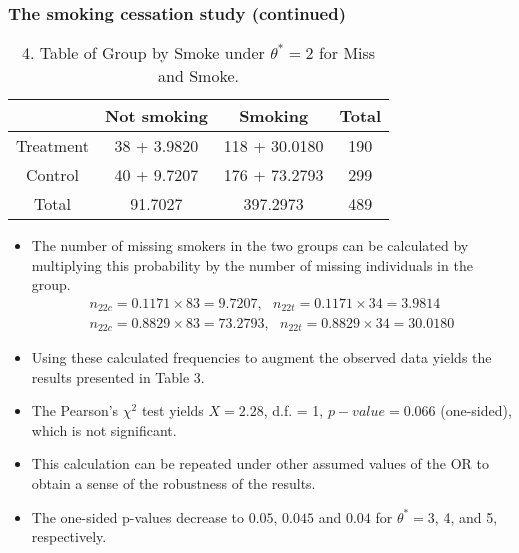 \documentclass{beamer}
\begin{document}
\begin{frame}
\frametitle{The smoking cessation study (continued)}
\begin{table}
\caption{4. Table of Group by Smoke under $\theta^* = 2$ for Miss and Smoke.}\label{tbl3}
\centering
\begin{tabular}{c|cc|c}\hline
 & Not smoking & Smoking & Total \\\hline
Treatment & 38 + {\color{red}3.9820} & 118 + {\color{red}30.0180} & 190 \\
Control & 40 + {\color{red}9.7207} & 176 + {\color{red}73.2793} & 299 \\\hline
Total  & 91.7027 & 397.2973 & 489\\\hline
\end{tabular}
\end{table}
\begin{itemize}
\item The number of missing smokers in the two groups can be calculated by multiplying this probability by the number of missing individuals in the group.
\begin{align}
n_{22c} = 0.1171\times 83 = 9.7207,~~~n_{22t} = 0.1171\times 34 = 3.9814  \\
n_{22c} = 0.8829\times 83 = 73.2793,~~~n_{22t} = 0.8829\times 34 = 30.0180 \nonumber
\end{align}
\item Using these calculated frequencies to augment the observed data yields the results presented in Table 3.
\item The Pearson’s $\chi^2$ test yields $X = 2.28$, d.f. = 1, $p-value = 0.066$ (one-sided), which is not significant. 
\item This calculation can be repeated under other assumed values of the OR to obtain a sense of the robustness of the results.
\item The one-sided p-values decrease to $0.05$, $0.045$ and $0.04$ for $\theta^* = 3$, 4, and 5, respectively.
\end{itemize}
\end{frame}
\end{document}
